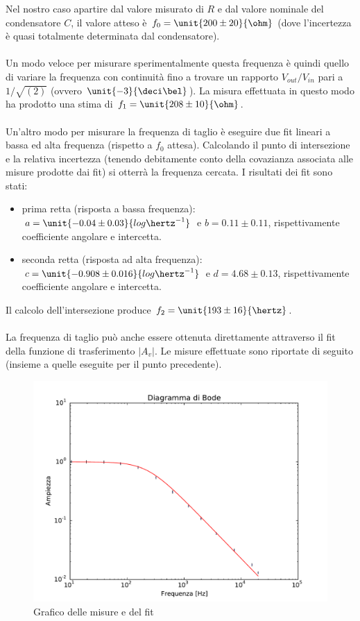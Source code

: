 \documentclass[10pt,a4paper]{article}
\begin{document}
Nel nostro caso apartire dal valore misurato di $R$ e dal valore nominale del condensatore $C$, il valore atteso è $f_0 = \unit{200 \pm 20}{\ohm}$ (dove l'incertezza è quasi totalmente determinata dal condensatore).
\\\\
Un modo veloce per misurare sperimentalmente questa frequenza è quindi quello di variare la frequenza con continuità fino a trovare  un rapporto $V_{out}/V_{in}$ pari a $1/\sqrt{(2)}$ (ovvero $\unit{-3}{\deci\bel}$). La misura effettuata in questo modo ha prodotto una stima di $f_1 =\unit{208 \pm 10}{\ohm}$.
\\\\
Un'altro modo per misurare la frequenza di taglio è eseguire due fit lineari a bassa ed alta frequenza (rispetto a $f_0$ attesa). Calcolando il punto di intersezione e la relativa incertezza (tenendo debitamente conto della covazianza associata alle misure prodotte dai fit) si otterrà la frequenza cercata. I risultati dei fit sono stati: 
\begin{itemize}
	\item prima retta (risposta a bassa frequenza):	 $a=\unit{-0.04 \pm 0.03}{log{\hertz^{-1}}}$ e	 $b=0.11 \pm 0.11$, rispettivamente coefficiente angolare e intercetta.
	\item seconda retta (risposta ad alta frequenza):	 $c=\unit{-0.908 \pm 0.016}{log{\hertz^{-1}}}$ e	 $d=4.68\pm 0.13$, rispettivamente coefficiente angolare e intercetta.
\end{itemize}
Il calcolo dell'intersezione produce $f_2 =\unit{ 193 \pm 16}{\hertz}$.
\\\\
La frequenza di taglio può anche essere ottenuta direttamente attraverso il fit della funzione di trasferimento $|A_v|$. Le misure effettuate sono riportate di seguito (insieme a quelle eseguite per il punto precedente).

\begin{figure}[h!]
	\centering
		
		\centering
		\includegraphics[width=1\textwidth]{../grafici/fit_Bode_Lowpass_800ohm.pdf}
		\caption{Grafico delle misure e del fit}
\end{figure}
\end{document}
